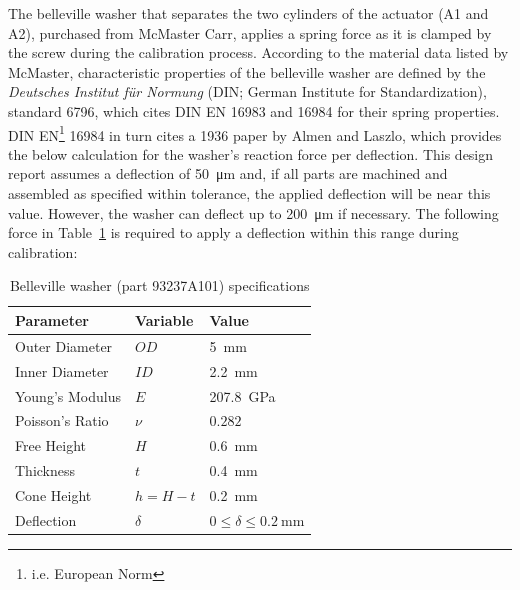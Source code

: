 \documentclass[12pt, letterpaper]{report}%
\begin{document}
\begin{appendices}
			The belleville washer that separates the two cylinders of the actuator (A1 and A2), purchased from McMaster Carr\cite{ref_McMaster_belle}, applies a spring force as it is clamped by the screw during the calibration process.
			According to the material data listed by McMaster, characteristic properties of the belleville washer are defined by the \textit{Deutsches Institut für Normung} (DIN; German Institute for Standardization), standard 6796\cite{ref_din6796},
			which cites DIN EN 16983\cite{ref_dinen16983} and 16984\cite{ref_dinen16984} for their spring properties. DIN EN\footnote{i.e. European Norm} 16984 in turn cites a 1936 paper by Almen and Laszlo\cite{ref_almen1936}, which provides the below calculation for the washer's reaction force per deflection.
			This design report assumes a deflection of \SI{50}{\micro\meter} and, if all parts are machined and assembled as specified within tolerance, the applied deflection will be near this value.
			However, the washer can deflect up to \SI{200}{\micro\meter} if necessary.
			The following force in Table~\ref{tab:belle} is required to apply a deflection within this range during calibration:

			\vspace{1em}
			\begin{table}[H]
				\centering
				\caption{Belleville washer (part 93237A101) specifications\cite{ref_McMaster_belle, ref_Ledbetter_Stainless}}
				\label{tab:belle}
				\begin{tabular}{lll}
					\toprule
					Parameter & Variable & Value \\
					\midrule
					Outer Diameter    & $OD$          & \SI{5}{\milli\meter} \\
					Inner Diameter    & $ID$          & \SI{2.2}{\milli\meter} \\
					Young's Modulus   & $E$           & \SI{207.8}{\giga\pascal} \\
					Poisson's Ratio   & $\nu$         & $0.282$ \\
					Free Height       & $H$           & \SI{0.6}{\milli\meter} \\
					Thickness         & $t$           & \SI{0.4}{\milli\meter} \\
					Cone Height       & $h = H - t$   & \SI{0.2}{\milli\meter} \\
					Deflection        & $\delta$      & $0 \leq \delta \leq \SI{0.2}{\milli\meter}$ \\
					\bottomrule
				\end{tabular}
			\end{table}


\end{appendices}
\end{document}
